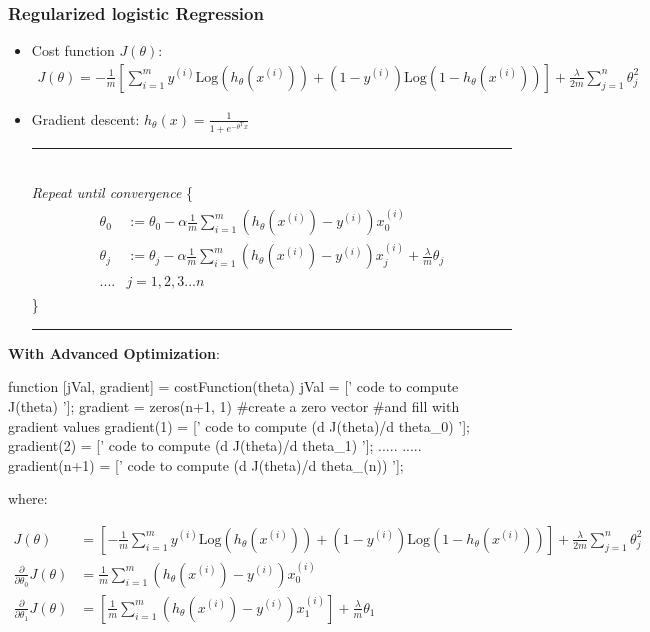\documentclass[a4paper,12pt]{report}
\begin{document}
\subsubsection{Regularized logistic Regression}
\begin{itemize}
\item Cost function $J(\theta)$:\\
\begin{align*}
J(\theta) = - \frac{1}{m} \left[ \sum_{i=1} ^m y^{(i)} \mathrm{Log} ( h_{\theta}(x^{(i)})) + (1- y^{(i)}) \mathrm{Log} ( 1- h_{\theta}(x^{(i)})) \right] + \frac{\lambda}{2m} \sum_{j=1} ^{n} \theta_j ^2
\end{align*}

\item Gradient descent: $h_{\theta}(x) = \frac{1}{1+e^{-\theta^{\mathrm{T}}x}}$ \\
\noindent\rule{\linewidth}{0.4pt} 
\\ \textit{Repeat until convergence} \{
\begin{align*}
\begin{split}
\theta_0  &:= \theta_0 - \alpha\frac{1}{m} \sum_{i=1} ^{m} \left( h_{\theta}(x^{(i)})-y^{(i)}\right) x_{0}^{(i)}\\
\theta_j  &:= \theta_j - \alpha\frac{1}{m} \sum_{i=1} ^{m} \left( h_{\theta}(x^{(i)})-y^{(i)}\right) x_{j}^{(i)} + \frac{\lambda}{m} \theta_j\\
....& j=1,2,3...n
\end{split}
\end{align*}
\} \\
\noindent\rule{\linewidth}{0.4pt}
\end{itemize}

\textbf{With Advanced Optimization}: \\
\begin{python}
function [jVal, gradient] = costFunction(theta)
	jVal = [' code to compute J(theta) ']; 
	gradient = zeros(n+1, 1) #create a zero vector 
	#and fill with gradient values 
	gradient(1) = [' code to compute (d J(theta)/d theta_0) ']; 
	gradient(2) = [' code to compute (d J(theta)/d theta_1)	'];
	.....
	.....
	gradient(n+1) = [' code to compute (d J(theta)/d theta_(n))	'];			
\end{python}
where:

\begin{align*}
J(\theta) & = \left[ -\frac{1}{m} \sum_{i=1} ^m y^{(i)} \mathrm{Log} \left(h_{\theta}(x^{(i)}) \right) + (1-y^{(i)}) \mathrm{Log} \left(1-h_{\theta}(x^{(i)}) \right) \right] + \frac{\lambda}{2m} \sum_{j=1} ^{n} \theta_j ^2 \\
\frac{\partial}{\partial \theta_0}J(\theta) & = \frac{1}{m} \sum_{i=1} ^m \left(h_{\theta}(x^{(i)}) - y^{(i)} \right) x_0 ^{(i)} \\
\frac{\partial}{\partial \theta_1}J(\theta) & = \left[ \frac{1}{m} \sum_{i=1} ^m \left(h_{\theta}(x^{(i)}) -y^{(i)} \right) x_1 ^{(i)} \right] + \frac{\lambda}{m} \theta_1 \\
\end{align*}
\end{document}
